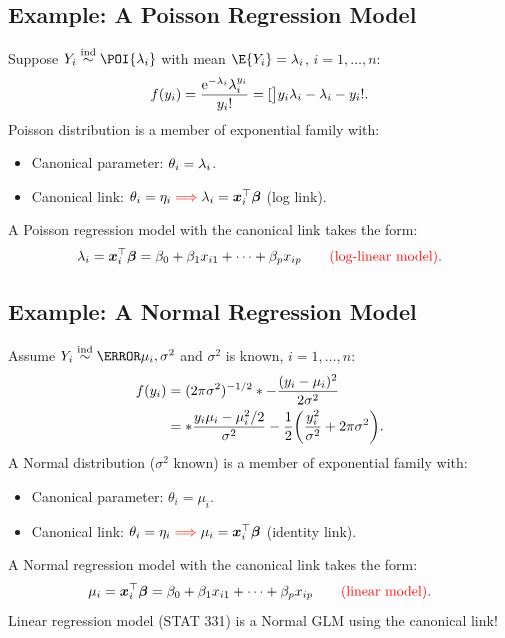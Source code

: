 \documentclass[oneside]{book}\usepackage[]{graphicx}\usepackage[svgnames]{xcolor}
\let\exp\relax%
\let\log\relax%
\newcommand{\ind}{\overset{\text{ind}}{\sim}}%
\providecommand{\Vector}[1]{\bm{#1}}%
\begin{document}
\subsection*{Example: A Poisson Regression Model}
Suppose $ Y_i \ind\POI{\lambda_i} $ with mean $ \E{Y_i}=\lambda_i $, $ i=1,\ldots,n $:
\[ f(y_i)=\frac{\mathrm{e}^{-\lambda_i}\lambda_i^{y_i}}{y_i!}=\exp[\big]{y_i\log{\lambda_i}-\lambda_i-\log{y_i!}}.  \]
Poisson distribution is a member of exponential family with:
\begin{itemize}
    \item Canonical parameter: $ \theta_i=\log{\lambda_i} $.
    \item Canonical link: $ \theta_i=\eta_i\textcolor{Red}{\implies}\log{\lambda_i}=\Vector{x}_i^\top \Vector{\beta} $ (log link).
\end{itemize}
A Poisson regression model with the canonical link takes the form:
\[ \log{\lambda_i}=\Vector{x}_i^\top \Vector{\beta}=\beta_0+\beta_1x_{i1}+\cdots+\beta_p x_{ip}\qquad \text{\textcolor{Red}{(log-linear model)}}. \]
\subsection*{Example: A Normal Regression Model}
Assume $ Y_i \ind \N{\mu_i,\sigma^2} $ and $ \sigma^2 $ is known, $ i=1,\ldots,n $:
\begin{align*}
    f(y_i)
     & =(2\pi\sigma^2)^{-1/2}\exp*{-\frac{(y_i-\mu_i)^2}{2\sigma^2}}                                                   \\
     & =\exp*{\frac{y_i\mu_i-\mu_i^2/2}{\sigma^2}-\frac{1}{2}\biggl(\frac{y_i^2}{\sigma^2}+\log{2\pi\sigma^2}\biggr)}.
\end{align*}
A Normal distribution ($ \sigma^2 $ known) is a member of exponential family with:
\begin{itemize}
    \item Canonical parameter: $ \theta_i=\mu_i $.
    \item Canonical link: $ \theta_i=\eta_i \textcolor{Red}{\implies}\mu_i=\Vector{x}_i^\top \Vector{\beta} $ (identity link).
\end{itemize}
A Normal regression model with the canonical link takes the form:
\[ \mu_i=\Vector{x}_i^\top \Vector{\beta}=\beta_0+\beta_1x_{i1}+\cdots+\beta_p x_{ip}\qquad \text{\textcolor{Red}{(linear model)}}. \]
Linear regression model (STAT 331) is a Normal GLM using the canonical link!
\end{document}

